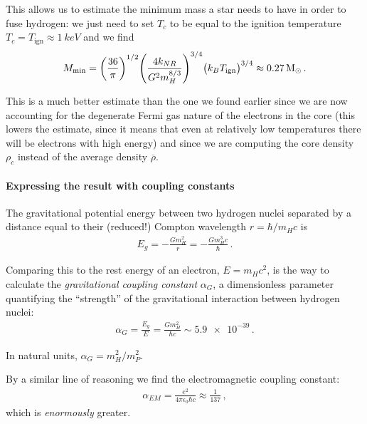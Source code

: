 \documentclass[main.tex]{subfiles}
\begin{document}
This allows us to estimate the minimum mass a star needs to have in order to fuse hydrogen: we just need to set \(T_c\) to be equal to the ignition temperature \(T_c = T _{\text{ign}} \approx \SI{1}{keV}\) and we find
%
\begin{align}
  M _{\text{min}} = 
  \qty(\frac{36}{\pi })^{1/2} 
  \qty(\frac{4 k_{NR}}{G^2m_H^{8/3}})^{3/4}
  \qty(k_B T _{\text{ign}})^{3/4}
  \approx \SI{.27}{M_{\odot}}
\,.
\end{align}

This is a much better estimate than the one we found earlier since we are now accounting for the degenerate Fermi gas nature of the electrons in the core (this lowers the estimate, since it means that even at relatively low temperatures there will be electrons with high energy) and since we are computing the core density \(\rho _c\) instead of the average density \(\overline{\rho}\). 


\paragraph{Expressing the result with coupling constants}

The gravitational potential energy between two hydrogen nuclei separated by a distance equal to their (reduced!) Compton wavelength \(r = \hbar / m_H c\) is 
%
\begin{align}
E_g = - \frac{G m_H^2}{r} = - \frac{G m_H^{3}c }{\hbar}
\,.
\end{align}

Comparing this to the rest energy of an electron, \(E = m_H c^2\), is the way to calculate the \emph{gravitational coupling constant} \(\alpha _G\), a dimensionless parameter quantifying the ``strength'' of the gravitational interaction between hydrogen nuclei:
%
\begin{align}
  \alpha_{G} = \frac{E_g}{E} =  \frac{G m_H^2}{\hbar c} \sim \num{5.9e-39}
\,.
\end{align}

In natural units, \(\alpha _G = m_H^2 / m_P^2\).

By a similar line of reasoning we find the electromagnetic coupling constant:
%
\begin{align}
  \alpha_{EM} = \frac{e^2}{4 \pi \epsilon_{0} \hbar c} \approx \frac{1}{137}
\,,
\end{align}
%
which is \emph{enormously} greater. 
\end{document}
